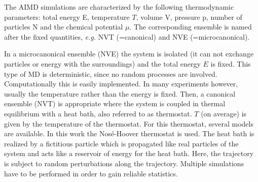 \documentclass[11pt,DIV=13,BCOR=5mm,a4paper,headinclude]{scrbook}
\begin{document}
The AIMD simulations are characterized by the following thermodynamic parameters: total energy E, temperature $T$, volume V, pressure p, number of particles N and the chemical potential $\mu$.
The corresponding ensemble is named after the fixed quantities, \textit{e.g.} NVT (=canonical) and NVE (=microcanonical).


In a microcanonical ensemble (NVE) the system is isolated (it can not exchange particles or energy with the surroundings) and the total energy $E$ is fixed.
This type of MD is deterministic, since no random processes are involved.
Computationally this is easily implemented.
In many experiments however, usually the temperature rather than the energy is fixed.
Then, a canonical ensemble (NVT) is appropriate where the system is coupled in thermal equilibrium with a heat bath, also referred to as thermostat.
$T$ (on average) is given by the temperature of the thermostat.
For this thermostat, several models are available.
In this work the Nos\'{e}-Hoover thermostat\cite{nose1984,nose1984_2,hoover1985} is used.
The heat bath is realized by a fictitious particle which is propagated like real particles of the system and acts like a reservoir of energy for the heat bath.
Here, the trajectory is subject to random perturbations along the trajectory.
Multiple simulations have to be performed in order to gain reliable statistics.
\end{document}
